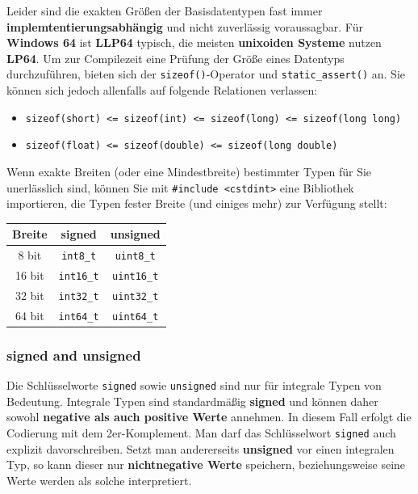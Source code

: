 \documentclass[a4paper]{report}
\begin{document}
Leider sind die exakten Größen der Basisdatentypen fast immer \textbf{implemtentierungsabhängig} und nicht zuverlässig voraussagbar. Für \textbf{Windows 64} ist \textbf{LLP64} typisch, die meisten \textbf{unixoiden Systeme} nutzen \textbf{LP64}. Um zur Compilezeit eine Prüfung der Größe eines Datentyps durchzuführen, bieten sich der \texttt{sizeof()}-Operator und \texttt{static\_assert()} an. Sie können sich jedoch allenfalls auf folgende Relationen verlassen:

\begin{itemize}
	\item \texttt{sizeof(short) \quad <= \quad sizeof(int) \quad <= \quad sizeof(long) \quad <= \quad sizeof(long long)}
	\item \texttt{sizeof(float) \quad <= \quad sizeof(double) \quad <= \quad sizeof(long double)}
\end{itemize}

\begin{multicols}{2}
Wenn exakte Breiten (oder eine Mindestbreite) bestimmter Typen für Sie unerlässlich sind, können Sie mit \texttt{\#include <cstdint>} eine Bibliothek importieren, die Typen fester Breite (und einiges mehr) zur Verfügung stellt:

\begin{center}
\begin{tabular}{|c||cc|}
	\hline
	\textbf{Breite} & \textbf{signed} & \textbf{unsigned} \\ \hline
	8 bit & \texttt{int8\_t} & \texttt{uint8\_t} \\
	16 bit & \texttt{int16\_t} & \texttt{uint16\_t} \\
	32 bit & \texttt{int32\_t} & \texttt{uint32\_t} \\
	64 bit & \texttt{int64\_t} & \texttt{uint64\_t} \\
	\hline
	
\end{tabular}
\end{center}
\end{multicols}

\subsubsection{signed and unsigned}
Die Schlüsselworte \texttt{signed} sowie \texttt{unsigned} sind nur für integrale Typen von Bedeutung. Integrale Typen sind standardmäßig \textbf{signed} und können daher sowohl \textbf{negative als auch positive Werte} annehmen. In diesem Fall erfolgt die Codierung mit dem 2er-Komplement. Man darf das Schlüsselwort \texttt{signed} auch explizit davorschreiben. Setzt man andererseits \textbf{unsigned} vor einen integralen Typ, so kann dieser nur \textbf{nichtnegative Werte} speichern, beziehungsweise seine Werte werden als solche interpretiert.
\end{document}
